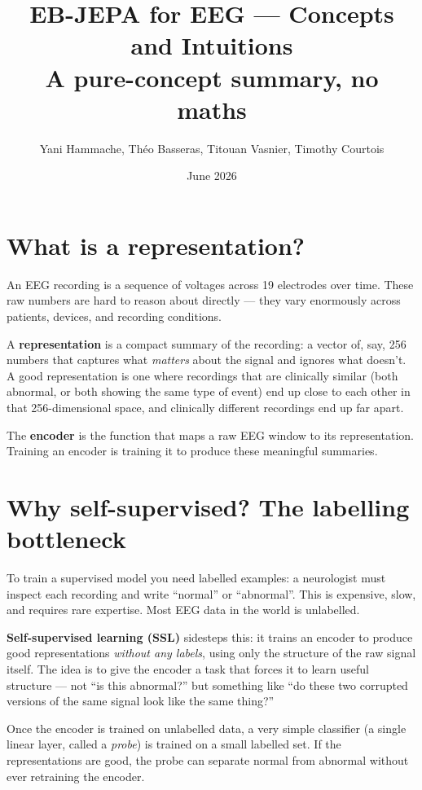 \documentclass[11pt,a4paper]{article}
\title{\textbf{EB-JEPA for EEG — Concepts and Intuitions}\\
\large A pure-concept summary, no maths}
\author{Yani Hammache, Théo Basseras, Titouan Vasnier, Timothy Courtois}
\date{June 2026}
\begin{document}
\maketitle

\section*{What is a representation?}

An EEG recording is a sequence of voltages across 19 electrodes over time.
These raw numbers are hard to reason about directly — they vary enormously
across patients, devices, and recording conditions.

A \textbf{representation} is a compact summary of the recording: a vector of,
say, 256 numbers that captures what \emph{matters} about the signal and ignores
what doesn't.  A good representation is one where recordings that are clinically
similar (both abnormal, or both showing the same type of event) end up close to
each other in that 256-dimensional space, and clinically different recordings
end up far apart.

The \textbf{encoder} is the function that maps a raw EEG window to its
representation.  Training an encoder is training it to produce these
meaningful summaries.

\section*{Why self-supervised? The labelling bottleneck}

To train a supervised model you need labelled examples: a neurologist must
inspect each recording and write ``normal'' or ``abnormal''.  This is
expensive, slow, and requires rare expertise.  Most EEG data in the world
is unlabelled.

\textbf{Self-supervised learning (SSL)} sidesteps this: it trains an encoder
to produce good representations \emph{without any labels}, using only the
structure of the raw signal itself.  The idea is to give the encoder a task
that forces it to learn useful structure — not ``is this abnormal?'' but
something like ``do these two corrupted versions of the same signal look like
the same thing?''

Once the encoder is trained on unlabelled data, a very simple classifier
(a single linear layer, called a \emph{probe}) is trained on a small
labelled set.  If the representations are good, the probe can separate
normal from abnormal without ever retraining the encoder.
\end{document}
